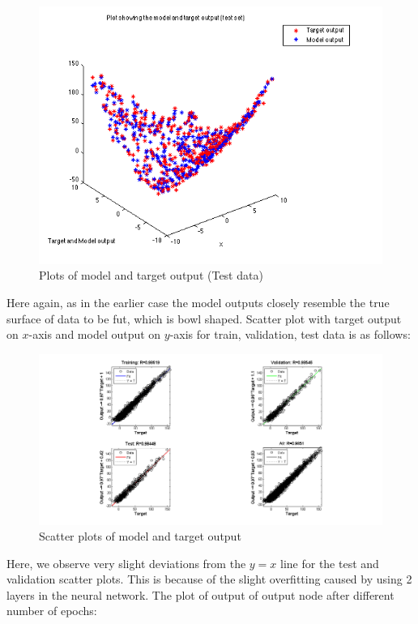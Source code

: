 \begin{figure}[H]
\centering
\includegraphics[width=0.5\linewidth]{Regression/bivariate/output_2layer_test.png}
\caption{Plots of model and target output (Test data)}
\end{figure}

\begin{flushleft}

Here again, as in the earlier case the model outputs closely resemble the true surface of data to be fut, which is bowl shaped.
Scatter plot with target output on $x$-axis and model output on $y$-axis for train, validation, test data is as follows:
\end{flushleft}


\begin{figure}[H]
\centering
\includegraphics[width=1.2\linewidth]{Regression/bivariate/scatter_2layers.png}
\caption{Scatter plots of model and target output}
\end{figure}

Here, we observe very slight deviations from the $y = x$ line for the test and validation scatter plots. This is because of the slight overfitting caused by using 2 layers in the neural network.
The plot of output of output node after different number of epochs:

